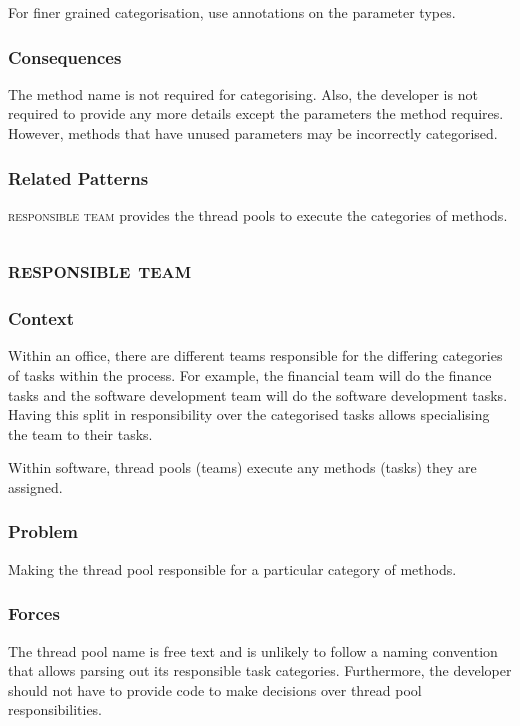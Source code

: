\documentclass[prodmode]{style/acmlarge}
\begin{document}
For finer grained categorisation, use annotations on the parameter types.

\subsubsection*{Consequences} The method name is not required for categorising.
Also, the developer is not required to provide any more details except the
parameters the method requires.  However, methods that have unused parameters
may be incorrectly categorised.

\subsubsection*{Related Patterns} \textsc{responsible team} provides the thread
pools to execute the categories of methods.



\subsection{\textsc{\textbf{responsible team}}}

\subsubsection*{Context} Within an office, there are different teams responsible
for the differing categories of tasks within the process.  For example, the
financial team will do the finance tasks and the software development team will
do the software development tasks.  Having this split in responsibility over the
categorised tasks allows specialising the team to their tasks.

Within software, thread pools (teams) execute any methods (tasks) they are
assigned.

\subsubsection*{\textbf{Problem}} Making the thread pool responsible for a particular
category of methods.

\subsubsection*{Forces} The thread pool name is free text and is unlikely to
follow a naming convention that allows parsing out its responsible task
categories.  Furthermore, the developer should not have to provide code to make
decisions over thread pool responsibilities.
\end{document}
